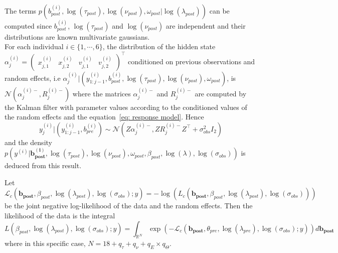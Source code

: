 \documentclass[11pt]{article}
\newcommand {\1}{\mathbb{1}}
\begin{document}
The terms $p\left(b^{(i)}_{post},  
\log(\tau_{post}),\log(\nu_{post}),\omega_{post}\vert \log(\lambda_{post})\right)$ can be computed since $b^{(i)}_{post}$, $\log(\tau_{post})$ and  $\log(\nu_{post})$ are independent and their distributions are known multivariate gaussians.\\

For each individual $i \in \{1,\cdots,6\}$, the distribution of the hidden state $\alpha^{(i)}_j=\begin{pmatrix} x^{(i)}_{j,1} & x^{(i)}_{j,2} & v^{(i)}_{j,1} & v^{(i)}_{j,2}\end{pmatrix}^\top$ conditioned on previous observations and random effects, i.e $\alpha_j^{(i)} \vert (y^{(i)}_{1:j-1},b_{post}^{(i)},\log(\tau_{post}),\log(\nu_{post}),\omega_{post})$, is $\mathcal{N}(\alpha_j^{(i)-}, R_j^{(i)-})$ where the matrices $\alpha_j^{(i)-}$ and $R_j^{(i)-}$ are computed by the Kalman filter with parameter values according to the conditioned values of the random effects and the equation~\ref{eq: response model}.
Hence
\begin{equation} y_j^{(i)} \vert (y_{1:j-1}^{(i)}, b_{pre}^{(i)}) \sim \mathcal{N} \left( Z \alpha_j^{(i)-},Z R_j^{(i)-} Z^\top+\sigma_{obs}^2 I_2 \right)
	\label{eq: ditribution of observations conditioned on random effects}
\end{equation}
and the density $p\left(y^{(i)} \vert \pmb{b^{(i)}_{post}},\log(\tau_{post}),\log(\nu_{post}),\omega_{post},\beta_{post},\log(\lambda),\log(\sigma_{obs})\right)$ is deduced from this result.


Let $\mathcal{L}_c(\pmb{b_{post}},\beta_{post},\log(\lambda_{post}),\log(\sigma_{obs});y)= - \log( L_c(\pmb{b_{post}},\beta_{post},\log(\lambda_{post}),\log(\sigma_{obs})))$ be the joint negative log-likelihood of the data and the random effects. 
Then the likelihood of the data is the integral 
\[
L(\beta_{post},\log(\lambda_{post}),\log(\sigma_{obs});y)=\int_{\mathbb{R}^{N}} \exp(-\mathcal{L}_c(\pmb{b_{post}},\theta_{pre},\log(\lambda_{pre}),\log(\sigma_{obs});y) )d\pmb{b_{post}}
\]
where in this specific case, $N=18+q_{\tau}+q_{\nu}+q_{E}\times q_{\Theta}$.
\end{document}
